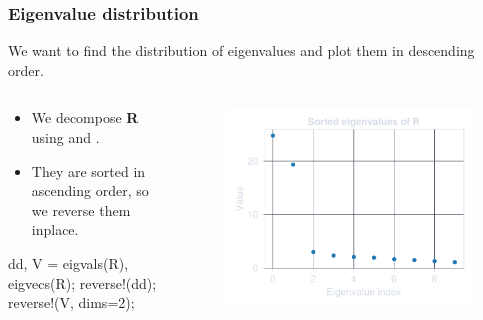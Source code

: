 \documentclass[compress,aspectratio=169]{beamer}
\begin{document}
\begin{frame}[fragile] %
    \frametitle{Eigenvalue distribution}
    We want to find the distribution of eigenvalues and plot them in descending
    order.
    \begin{columns}
        \begin{column}{0.5\textwidth}
            \begin{itemize}
                \item We decompose {\bf R} using  and .
                \item They are sorted in ascending order, so we reverse them inplace.
            \end{itemize}
            \begin{jllisting}[gobble=16]
                dd, V = eigvals(R), eigvecs(R);
                reverse!(dd); reverse!(V, dims=2);
            \end{jllisting}
        \end{column}
        \begin{column}{0.5\textwidth}
            \begin{figure}
                \includegraphics[width=\columnwidth]{"../d.pdf"}
            \end{figure}
        \end{column}
    \end{columns}
\end{frame}
\end{document}
